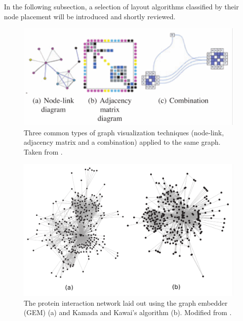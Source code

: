 In the following subsection, a selection of layout algorithms classified by their node placement will be introduced and shortly reviewed.
\begin{figure}
    \centering
    \includegraphics[width=\linewidth]{media/vis_types.pdf}
    \caption{Three common types of graph visualization techniques (node-link, adjacency matrix and a combination) applied to the same graph. Taken from \cite{VonLandesberger2011}.}
    \label{fig:vis_types}
\end{figure}

\begin{figure}
    \centering
    \includegraphics[scale=0.14]{media/layout_techniques.pdf}
    \caption{The protein interaction network laid out using the graph embedder (GEM) (a) and Kamada and Kawai's algorithm (b). Modified from \cite{Gibson2013}.}
    \label{fig:layout_techniques}
\end{figure}
